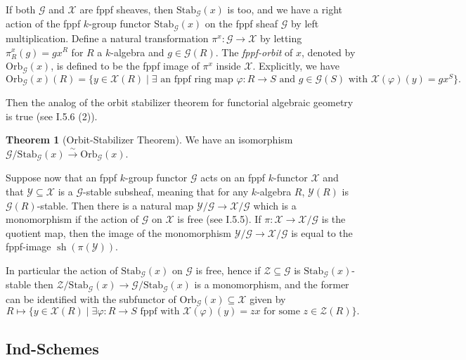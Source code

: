 \documentclass[oneside,11pt]{amsart}
\newcommand{\mX}{\ensuremath{\mathcal{X}}}
\newcommand{\mY}{\ensuremath{\mathcal{Y}}}
\newcommand{\mZ}{\ensuremath{\mathcal{Z}}}
\newcommand{\mG}{\ensuremath{\mathcal{G}}}
\newcommand{\Stab}{\ensuremath{\text{Stab}}}
\newcommand{\Orb}{\ensuremath{\text{Orb}}}
\newcommand{\sh}{\operatorname{sh}}
\theoremstyle{definition}
\newtheorem{proof techniques}{Proof Techniques}
\newtheorem{theorem}{Theorem}
\begin{document}
If both $\mG$ and $\mX$ are fppf sheaves, then $\Stab_\mG(x)$ is too, and we have a right action of the fppf $k$-group functor $\Stab_\mG(x)$ on the fppf sheaf $\mG$ by left multiplication. Define a natural transformation $\pi^x : \mG \to \mX$ by letting $\pi^x_R(g) = g x^R$ for $R$ a $k$-algebra and $g \in \mG(R)$. The \emph{fppf-orbit} of $x$, denoted by $\Orb_\mG(x)$, is defined to be the fppf image of $\pi^x$ inside $\mX$. Explicitly, we have 
\begin{equation}\label{eq: fppf orbit}
\Orb_\mG(x)(R) = \{ y \in \mX(R) \mid \exists \text{ an fppf ring map } \varphi: R \to S \text{ and } g \in \mG(S) \text{ with } \mX(\varphi)(y) = g x^S \}.
\end{equation}

Then the analog of the orbit stabilizer theorem for functorial algebraic geometry is true (see \cite{jantzen2003} I.5.6 (2)).

\begin{theorem}[Orbit-Stabilizer Theorem]
We have an isomorphism $\mG / \Stab_\mG(x) \overset{\sim}{\to} \Orb_\mG(x)$. 
\end{theorem}


Suppose now that an fppf $k$-group functor $\mG$ acts on an fppf $k$-functor $\mX$ and that $\mY \subseteq \mX$ is a $\mG$-stable subsheaf, meaning that for any $k$-algebra $R$, $\mY(R)$ is $\mG(R)$-stable. Then there is a natural map $\mY / \mG \to \mX / \mG$ which is a monomorphism if the action of $\mG$ on $\mX$ is free (see \cite{jantzen2003} I.5.5). If $\pi : \mX \to \mX / \mG$ is the quotient map, then the image of the monomorphism $\mY / \mG \to \mX / \mG$ is equal to the fppf-image $\sh(\pi(\mY))$. 

In particular the action of $\Stab_\mG(x)$ on $\mG$ is free, hence if $\mZ \subseteq \mG$ is $\Stab_\mG(x)$-stable then $\mZ / \Stab_\mG(x) \to \mG / \Stab_\mG(x)$ is a monomorphism, and the former can be identified with the subfunctor of $\Orb_\mG(x) \subseteq \mX$ given by 
\begin{equation}\label{eq: image of a subfunctor under the quotient map}
R \mapsto \{ y \in \mX(R) \mid \exists \varphi: R \to S \text{ fppf with } \mX(\varphi)(y) = zx \text{ for some } z \in \mZ(R) \}. 
\end{equation}



\subsection{Ind-Schemes}
\end{document}
